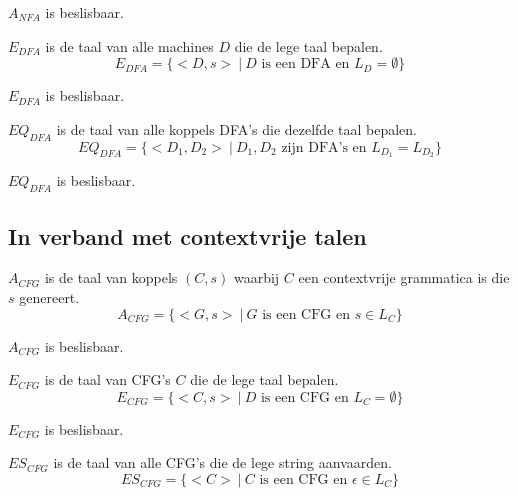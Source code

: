 \documentclass[main.tex]{subfiles}
\begin{document}
\begin{st}
  $A_{NFA}$ is beslisbaar.
\end{st}


\begin{de}
  $E_{DFA}$ is de taal van alle machines $D$ die de lege taal bepalen.
  \[ E_{DFA} = \{ <D,s>\ |\ D \text{ is een DFA en } L_{D} = \emptyset \} \]
\end{de}

\begin{st}
  $E_{DFA}$ is beslisbaar.
\end{st}

\begin{de}
  $EQ_{DFA}$ is de taal van alle koppels DFA's die dezelfde taal bepalen.
  \[ EQ_{DFA} = \{ <D_{1},D_{2}> \ |\ D_{1},D_{2} \text{ zijn DFA's en } L_{D_{1}} = L_{D_{2}} \} \]  
\end{de}

\begin{st}
  $EQ_{DFA}$ is beslisbaar.
\end{st}

\subsection{In verband met contextvrije talen}
\label{sec:verb-met-cont}

\begin{de}
  $A_{CFG}$ is de taal van koppels $(C,s)$ waarbij $C$ een contextvrije grammatica is die $s$ genereert.
  \[ A_{CFG} = \{ <G,s> \ |\ G \text{ is een CFG en } s \in L_{C} \} \]
\end{de}

\begin{st}
  $A_{CFG}$ is beslisbaar.
\end{st}

\begin{de}
  $E_{CFG}$ is de taal van CFG's $C$ die de lege taal bepalen.
  \[ E_{CFG} = \{ <C,s>\ |\ D \text{ is een CFG en } L_{C} = \emptyset \} \]
\end{de}

\begin{st}
  $E_{CFG}$ is beslisbaar.
\end{st}

\begin{de}
  $ES_{CFG}$ is de taal van alle CFG's die de lege string aanvaarden.
  \[ ES_{CFG} = \{ <C> \ |\ C \text{ is een CFG en } \epsilon \in L_{C}\} \]
\end{de}
\end{document}

